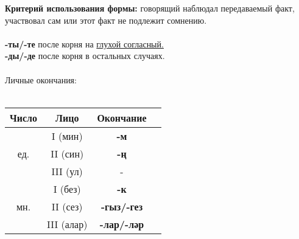 \textbf{Критерий использования формы:} говорящий наблюдал передаваемый факт, участвовал сам или этот факт не
подлежит сомнению.\\\\
\textbf{-ты/-те} после корня на \underline{глухой согласный.}\\
\textbf{-ды/-де} после корня в остальных случаях.\\\\
Личные окончания:\\\\
\begin{tabular}{ |c|c|c|c| } 
\hline
Число & Лицо & Окончание \\
\hline
\multirow{3}{4em}{ед.}
& I (мин) & \textbf{-м} \\  
& II (син) & \textbf{-ң} \\ 
& III (ул) & - \\ 
\hline
\multirow{3}{4em}{мн.}
& I (без) & \textbf{-к} \\  
& II (сез) & \textbf{-гыз/-гез} \\ 
& III (алар) & \textbf{-лар/-ләр} \\ 
\hline
\end{tabular} \\\\